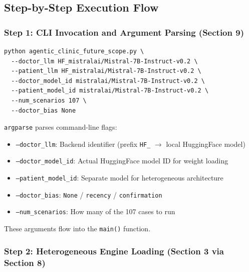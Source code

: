 \subsection{Step-by-Step Execution Flow}

\subsubsection{Step 1: CLI Invocation and Argument Parsing (Section 9)}

\begin{verbatim}
python agentic_clinic_future_scope.py \
  --doctor_llm HF_mistralai/Mistral-7B-Instruct-v0.2 \
  --patient_llm HF_mistralai/Mistral-7B-Instruct-v0.2 \
  --doctor_model_id mistralai/Mistral-7B-Instruct-v0.2 \
  --patient_model_id mistralai/Mistral-7B-Instruct-v0.2 \
  --num_scenarios 107 \
  --doctor_bias None
\end{verbatim}

\begin{acadbox}[\textcolor{white}{What Happens}]
\texttt{argparse} parses command-line flags:
\begin{itemize}
    \item \texttt{--doctor\_llm}: Backend identifier (prefix \texttt{HF\_} $\rightarrow$ local HuggingFace model)
    \item \texttt{--doctor\_model\_id}: Actual HuggingFace model ID for weight loading
    \item \texttt{--patient\_model\_id}: Separate model for heterogeneous architecture
    \item \texttt{--doctor\_bias}: \texttt{None} / \texttt{recency} / \texttt{confirmation}
    \item \texttt{--num\_scenarios}: How many of the 107 cases to run
\end{itemize}
These arguments flow into the \texttt{main()} function.
\end{acadbox}

\subsubsection{Step 2: Heterogeneous Engine Loading (Section 3 via Section 8)}

